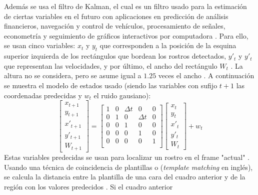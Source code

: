 \documentclass[a4paper,openright,12pt]{report}
\begin{document}
Además se usa el filtro de Kalman, el cual es un filtro usado para la estimación
de ciertas variables en el futuro con aplicaciones en predicción de análisis
financieros, navegación y control de vehículos, procesamiento de señales,
econometría y seguimiento de gráficos interactivos por computadora
\cite{bishop2001introduction}. Para ello, se usan cinco variables: $x_{t}$ 
y $y_{t}$ que corresponden a la posición de la esquina superior izquierda de los
rectángulos que bordean los rostros detectados, $y'_{t}$ y $y'_{t}$ que
representan las velocidades, y por último, el ancho del rectángulo $W_{t}$
\cite{shaik2007robust}. La altura no se considera, pero se asume igual a $1.25$
veces el ancho \cite{shaik2007robust}. A continuación se muestra el modelo de
estados usado (siendo las variables con sufijo ${t + 1}$ las coordenadas
predecidas y $w_{t}$ el ruido gausiano):
\[
    \begin{bmatrix}
        x_{t+1}\\
        y_{t+1}\\
        x'_{t+1}\\
        y'_{t+1}\\
        W_{t+1}
    \end{bmatrix}
    =
    \begin{bmatrix}
        1   &   0   &   \Delta{t}   &   0           &   0\\
        0   &   1   &   0           &   \Delta{t}   &   0\\
        0   &   0   &   1           &   0           &   0\\
        0   &   0   &   0           &   1           &   0\\
        0   &   0   &   0           &   0           &   1\\
    \end{bmatrix}
    \begin{bmatrix}
        x_{t}\\
        y_{t}\\
        x'_{t}\\
        y'_{t}\\
        W_{t}
    \end{bmatrix}
    +
    w_{t}
\]
Estas variables predecidas se usan para localizar un rostro en el frame
"actual" \cite{shaik2007robust}. Usando una técnica de coincidencia de plantillas o (\textit{template
matching} en inglés), se calcula la distancia entre la plantilla de una cara del
cuadro anterior y de la región con los valores predecidos \cite{shaik2007robust}. Si el cuadro anterior
\end{document}
